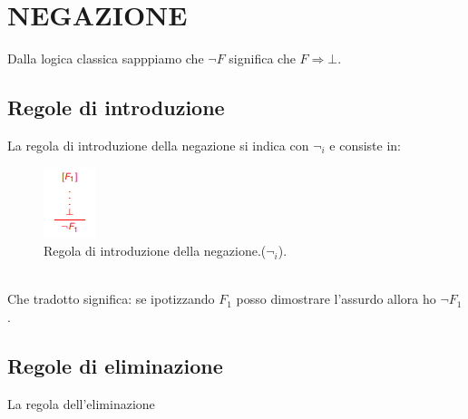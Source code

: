 \documentclass[12pt]{article}
\begin{document}
\section{NEGAZIONE}
Dalla logica classica sapppiamo che $ \neg F $ significa che $F \Rightarrow \bot $.

\pagebreak
\subsection{Regole di introduzione}
La regola di introduzione della negazione si indica con $\neg_i$ e consiste in:
\begin{figure}[!htb]
    \centering
    \includegraphics[width=.9\linewidth,height=.2\textheight,keepaspectratio]{logica_proposizionale/introduzione/introduzione_not.png} %
    \begin{center}
        \caption{\label{fig:introduzione_neg}Regola di introduzione della negazione.($\neg_i$).} %
    \end{center}
\end{figure}
\\
Che tradotto significa: se ipotizzando $F_1$ posso dimostrare l'assurdo allora ho $\neg F_1$.

\subsection{Regole di eliminazione}
La regola dell'eliminazione 
\end{document}
